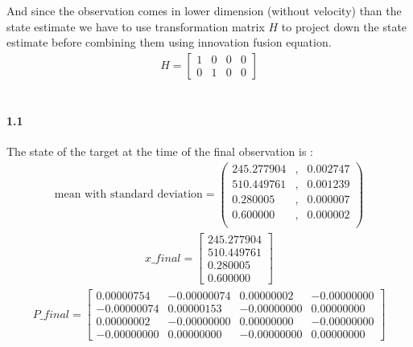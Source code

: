 \documentclass[a4paper]{article}
\begin{document}
\noindent And since the observation comes in lower dimension (without velocity) than the state estimate we have to use transformation matrix $H$ to project down the state estimate before combining them using innovation fusion equation. \\
\begin{align*}
H = \begin{bmatrix}
		1 & 0 & 0 & 0 \\
		0 & 1 & 0 & 0 
	\end{bmatrix}
\end{align*} \\

\paragraph{1.1 } The state of the target at the time of the final observation is : \\
\begin{align*}
\text{mean with standard deviation} = 
	\left(\begin{matrix}
		245.277904 & ,   &    0.002747 \\
    	510.449761 & ,   &    0.001239 \\
      	0.280005 & ,     &  0.000007 \\
      	0.600000 & ,     &  0.000002 \\
	\end{matrix}\right)
\end{align*}
\begin{align*}
x\_final = \begin{bmatrix}
		245.277904 \\
    	510.449761 \\
      	0.280005 \\
      	0.600000 
	\end{bmatrix}
\end{align*}
\begin{align*}
P\_final = \begin{bmatrix}
		0.00000754  &  -0.00000074   &  0.00000002  &  -0.00000000  \\
   		-0.00000074  &   0.00000153  &  -0.00000000  &   0.00000000 \\
    	0.00000002  &  -0.00000000  &   0.00000000  &  -0.00000000 \\
   		-0.00000000  &   0.00000000  &  -0.00000000  &   0.00000000 
	\end{bmatrix}
\end{align*} \\
\end{document}
